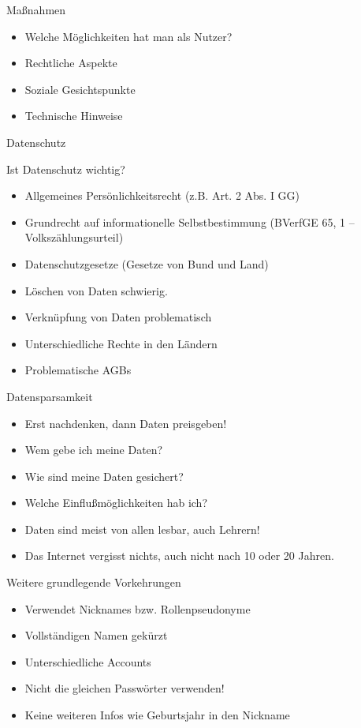 \begin{frame}{Maßnahmen}
	\begin{itemize}
		\item Welche M\"oglichkeiten hat man als Nutzer?
		\item Rechtliche Aspekte
		\item Soziale Gesichtspunkte
		\item Technische Hinweise
	\end{itemize}
\end{frame}

\begin{frame}{Datenschutz}
	\begin{center}Ist Datenschutz wichtig?
	\end{center}
	\begin{itemize}
		\item Allgemeines Pers\"onlichkeitsrecht (z.B. Art. 2 Abs. I GG)
		\item Grundrecht auf informationelle Selbstbestimmung (BVerfGE 65, 1 –Volksz\"ahlungsurteil)
		\item Datenschutzgesetze (Gesetze von Bund und Land)
	\end{itemize}
	\begin{itemize}
		\item L\"oschen von Daten schwierig.
		\item Verkn\"upfung von Daten problematisch
		\item Unterschiedliche Rechte in den L\"andern
		\item Problematische AGBs
	\end{itemize}
\end{frame}

\begin{frame}{Datensparsamkeit}
	\begin{itemize}
		\item Erst nachdenken, dann Daten preisgeben!
		\item Wem gebe ich meine Daten?
		\item Wie sind meine Daten gesichert?
		\item Welche Einflu\ss m\"oglichkeiten hab ich?
		\item Daten sind meist von allen lesbar, auch Lehrern!
		\item Das Internet vergisst nichts, auch nicht nach 10 oder 20 Jahren.
	\end{itemize}
\end{frame}

\begin{frame}{Weitere grundlegende Vorkehrungen}
	\begin{itemize}
		\item Verwendet Nicknames bzw. Rollenpseudonyme
		\item Vollst\"andigen Namen gek\"urzt
		\item Unterschiedliche Accounts
		\item Nicht die gleichen Passw\"orter verwenden!
		\item Keine weiteren Infos wie Geburtsjahr in den Nickname
	\end{itemize}
\end{frame}

